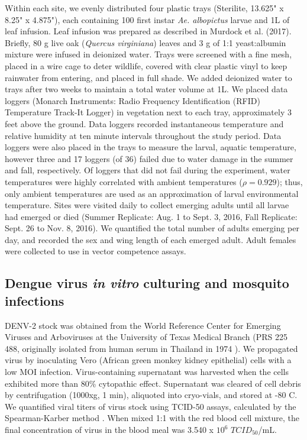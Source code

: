 \documentclass[doublespacing, linenumbers]{bmcart}
\begin{document}
Within each site, we evenly distributed four plastic trays (Sterilite, 13.625" x 8.25" x 4.875"), each containing 100 first instar \textit{Ae. albopictus} larvae and 1L of leaf infusion.
Leaf infusion was prepared as described in Murdock et al. (2017).
Briefly, 80 g live oak (\textit{Quercus virginiana}) leaves and 3 g of 1:1 yeast:albumin mixture were infused in deionized water.
Trays were screened with a fine mesh, placed in a wire cage to deter wildlife, covered with clear plastic vinyl to keep rainwater from entering, and placed in full shade.
We added deionized water to trays after two weeks to maintain a total water volume at 1L.
We placed data loggers (Monarch Instruments: Radio Frequency Identification (RFID) Temperature Track-It Logger) in vegetation next to each tray, approximately 3 feet above the ground.
Data loggers recorded instantaneous temperature and relative humidity at ten minute intervals throughout the study period.
Data loggers were also placed in the trays to measure the larval, aquatic temperature, however three and 17 loggers (of 36) failed due to water damage in the summer and fall, respectively.
Of loggers that did not fail during the experiment, water temperatures were highly correlated with ambient temperatures ($\rho=0.929$); thus, only ambient temperatures are used as an approximation of larval environmental temperature.
Sites were visited daily to collect emerging adults until all larvae had emerged or died (Summer Replicate: Aug. 1 to Sept. 3, 2016, Fall Replicate: Sept. 26 to Nov. 8, 2016).
We quantified the total number of adults emerging per day, and recorded the sex and wing length of each emerged adult.
Adult females were collected to use in vector competence assays.

\subsection*{Dengue virus \textit{in vitro} culturing and mosquito infections}

DENV-2 stock was obtained from the World Reference Center for Emerging Viruses and Arboviruses at the University of Texas Medical Branch (PRS 225 488, originally isolated from human serum in Thailand in 1974 \cite{vazeille-falcoz1999}).
We propagated virus by inoculating Vero (African green monkey kidney epithelial) cells with a low MOI infection.
Virus-containing supernatant was harvested when the cells exhibited more than 80\% cytopathic effect.
Supernatant was cleared of cell debris by centrifugation (1000xg, 1 min), aliquoted into cryo-vials, and stored at -80 \degree C.
We quantified viral titers of virus stock using TCID-50 assays, calculated by the Spearman-Karber method \cite{shao2016,willard2017}.
When mixed 1:1 with the red blood cell mixture, the final concentration of virus in the blood meal was 3.540 x $10^6$ $TCID_{50}$/mL.
\end{document}
